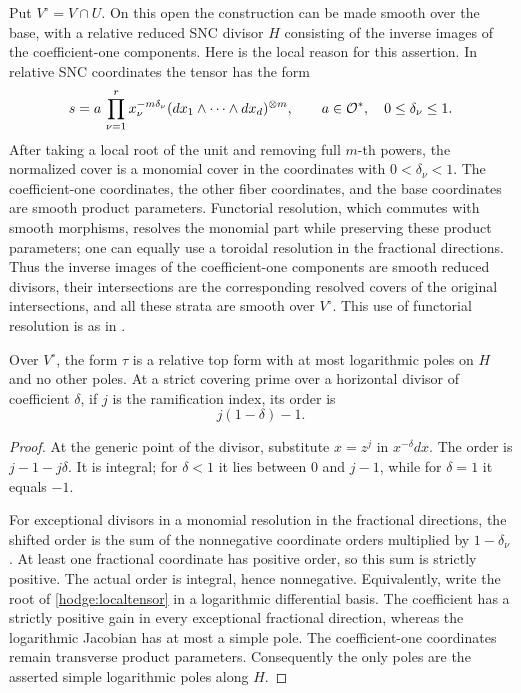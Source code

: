 Put \(V^\circ=V\cap U\).  On this open the construction can be made
smooth over the base, with a relative reduced SNC divisor \(H\)
consisting of the inverse images of the coefficient-one components.
Here is the local reason for this assertion.  In relative SNC
coordinates the tensor has the form
\begin{equation}
 s=
 a\,\prod_{\nu=1}^{r}x_\nu^{-m\delta_\nu}
 (dx_1\wedge\cdots\wedge dx_d)^{\otimes m},
 \qquad a\in\mathcal O^*,\quad 0\leq\delta_\nu\leq1.
 \label{hodge:localtensor}
\end{equation}
After taking a local root of the unit and removing full \(m\)-th
powers, the normalized cover is a monomial cover in the coordinates
with \(0<\delta_\nu<1\).  The coefficient-one coordinates, the other
fiber coordinates, and the base coordinates are smooth product
parameters.  Functorial resolution, which commutes with smooth
morphisms, resolves the monomial part while preserving these product
parameters; one can equally use a toroidal resolution in the fractional
directions.  Thus the inverse images of the coefficient-one
components are smooth reduced divisors, their intersections are the
corresponding resolved covers of the original intersections, and all
these strata are smooth over \(V^\circ\).  This use of functorial
resolution is as in \cite[Theorems~1.1 and~1.3]{BM08}.

\begin{lemma}
\label{hodge:rootpoles}
Over \(V^\circ\), the form \(\tau\) is a relative top form with at most
logarithmic poles on \(H\) and no other poles.  At a strict covering
prime over a horizontal divisor of coefficient \(\delta\), if \(j\)
is the ramification index, its order is
\[
                    j(1-\delta)-1.
\]
\end{lemma}

\begin{proof}
At the generic point of the divisor, substitute \(x=z^j\) in
\(x^{-\delta}dx\).  The order is \(j-1-j\delta\).  It is integral;
for \(\delta<1\) it lies between \(0\) and \(j-1\), while for
\(\delta=1\) it equals \(-1\).

For exceptional divisors in a monomial resolution in the fractional
directions, the shifted order is the sum of the nonnegative coordinate
orders multiplied by \(1-\delta_\nu\).  At least one fractional
coordinate has positive order, so this sum is strictly positive.
The actual order is integral, hence nonnegative.  Equivalently, write
the root of \eqref{hodge:localtensor} in a logarithmic differential
basis.  The coefficient has a strictly positive gain in every
exceptional fractional direction, whereas the logarithmic Jacobian
has at most a simple pole.  The coefficient-one coordinates remain
transverse product parameters.  Consequently the only poles are the
asserted simple logarithmic poles along \(H\).
\end{proof}

